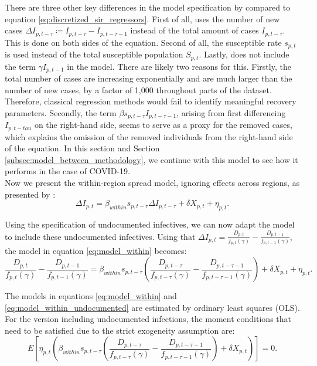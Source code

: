 \documentclass[12pt]{article}
\begin{document}
	There are three other key differences in the model specification by \textcite{adda2016economic} compared to equation \eqref{eq:discretized_sir_regressors}. First of all, \textcite{adda2016economic} uses the number of new cases $\Delta I_{p,t-\tau} \coloneqq I_{p,t-\tau} - I_{p,t-\tau-1}$ instead of the total amount of cases $I_{p,t-\tau}$. This is done on both sides of the equation. Second of all, the susceptible rate $s_{p,t}$ is used instead of the total susceptible population $S_{p,t}$. Lastly, \textcite{adda2016economic} does not include the term $\gamma I_{p,t-1}$ in the model. There are likely two reasons for this. Firstly, the total number of cases are increasing exponentially and are much larger than the number of new cases, by a factor of 1,000 throughout parts of the dataset. Therefore, classical regression methods would fail to identify meaningful recovery parameters. Secondly, the term $\beta s_{p,t-\tau} I_{p,t-\tau-1}$, arising from first differencing $I_{p,t-tau}$ on the right-hand side, seems to serve as a proxy for the removed cases, which explains the omission of the removed individuals from the right-hand side of the equation. In this section and Section \ref{subsec:model_between_methodology}, we continue with this model to see how it performs in the case of COVID-19.
	\\
	
	Now we present the within-region spread model, ignoring effects across regions, as presented by \textcite{adda2016economic}:
	\begin{equation} \label{eq:model_within}
	    \Delta I_{p,t} = \beta_{within} s_{p,t-\tau} \Delta I_{p,t-\tau} + \delta X_{p,t} + \eta_{p,t}.
	\end{equation}
	
	Using the specification of undocumented infectives, we can now adapt the model to include these undocumented infectives. Using that $\Delta I_{p,t} = \frac{D_{p,t}}{f_{p,t}(\gamma)} - \frac{D_{p,t-1}}{f_{p,t-1}(\gamma)}$, the model in equation \eqref{eq:model_within} becomes:
	    \begin{equation} \label{eq:model_within_undocumented}
		    \frac{D_{p,t}}{f_{p,t}(\gamma)} - \frac{D_{p,t-1}}{f_{p,t-1}(\gamma)} = \beta_{within}s_{p,t-\tau}\left(\frac{D_{p,t-\tau}}{f_{p,t-\tau}(\gamma)} - \frac{D_{p,t-\tau-1}}{f_{p,t-\tau-1}(\gamma)}\right) + \delta X_{p,t} + \eta_{p,t}.
	    \end{equation}
	
	The models in equations \eqref{eq:model_within} and \eqref{eq:model_within_undocumented} are estimated by ordinary least squares (OLS). For the version including undocumented infections, the moment conditions that need to be satisfied due to the strict exogeneity assumption are:
	    \[E\left[ \eta_{p,t} \left( \beta_{within}s_{p,t-\tau}\left(\frac{D_{p,t-\tau}}{f_{p,t-\tau}(\gamma)} - \frac{D_{p,t-\tau-1}}{f_{p,t-\tau-1}(\gamma)}\right) + \delta X_{p,t} \right) \right] = 0.\]
	
\end{document}
